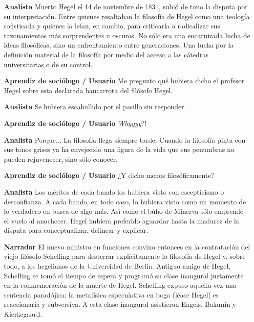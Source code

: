 \documentclass[
  spanish,
  11pt,
  a4paper,
]{scrbook}
\newenvironment{transcripcion}{
    \begin{list}{}{
        \setlength{\leftmargin}{1.5em}  %
        \setlength{\rightmargin}{0em}
        \setlength{\itemsep}{0.2em}     %
        \setlength{\parsep}{0.0em}
        \setlength{\listparindent}{0pt}
    }
}{
    \end{list}
}
\newcommand{\personaje}[1]{\textbf{#1}\quad}
\begin{document}
\begin{transcripcion}
\item \personaje{Analista} Muerto Hegel el 14 de noviembre de 1831, subió de tono la disputa por su interpretación. Entre quienes resaltaban la filosofía de Hegel como una teología sofisticada y quienes la leían, en cambio, para criticarla o radicalizar sus razonamientos más sorprendentes u oscuros. No sólo era una encarnizada lucha de ideas filosóficas, sino un enfrentamiento entre generaciones. Una lucha por la definición material de la filosofía por medio del acceso a las cátedras universitarias o de su control.

\item \personaje{Aprendiz de sociólogo / Usuario} Me pregunto qué hubiera dicho el profesor Hegel sobre esta declarada bancarrota del filósofo Hegel.

\item \personaje{Analista} Se hubiera escabullido por el pasillo sin responder.

\item \personaje{Aprendiz de sociólogo / Usuario} \textit{Whyyyy}?!

\item \personaje{Analista} Porque... La filosofía llega siempre tarde. Cuando la filosofía pinta con sus tonos grises ya ha envejecido una figura de la vida que sus penumbras no pueden rejuvenecer, sino sólo conocer.

\item \personaje{Aprendiz de sociólogo / Usuario} ¿Y dicho menos filosóficamente?

\item \personaje{Analista} Los méritos de cada bando los hubiera visto con escepticismo o desconfianza. A cada bando, en todo caso, lo hubiera visto como un momento de lo verdadero en busca de algo más. Así como el búho de Minerva sólo emprende el vuelo al anochecer, Hegel hubiera preferido aguardar hasta la madurez de la disputa para conceptualizar, delinear y explicar.

\item \personaje{Narrador} El nuevo ministro en funciones convino entonces en la contratación del viejo filósofo Schelling para desterrar explícitamente la filosofía de Hegel y, sobre todo, a los hegelianos de la Universidad de Berlín. Antiguo amigo de Hegel, Schelling se tomó el tiempo de espera y programó su clase inaugural justamente en la conmemoración de la muerte de Hegel. Schelling expuso aquella vez una sentencia paradójica: la metafísica especulativa en boga (léase Hegel) es reaccionaria y subversiva. A esta clase inaugural asistieron Engels, Bakunin y Kierkegaard.


\end{transcripcion}
\end{document}
